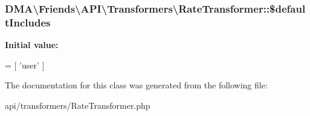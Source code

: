 \subsubsection[{\$default\+Includes}]{\setlength{\rightskip}{0pt plus 5cm}D\+M\+A\textbackslash{}\+Friends\textbackslash{}\+A\+P\+I\textbackslash{}\+Transformers\textbackslash{}\+Rate\+Transformer\+::\$default\+Includes\hspace{0.3cm}{\ttfamily [protected]}}\label{classDMA_1_1Friends_1_1API_1_1Transformers_1_1RateTransformer_a7bd7d6cf2606a64b75c5c677602ebb04}
{\bfseries Initial value\+:}
\begin{DoxyCode}
= [
            \textcolor{stringliteral}{'user'}
    ]
\end{DoxyCode}


The documentation for this class was generated from the following file\+:\begin{DoxyCompactItemize}
\item 
api/transformers/Rate\+Transformer.\+php\end{DoxyCompactItemize}
